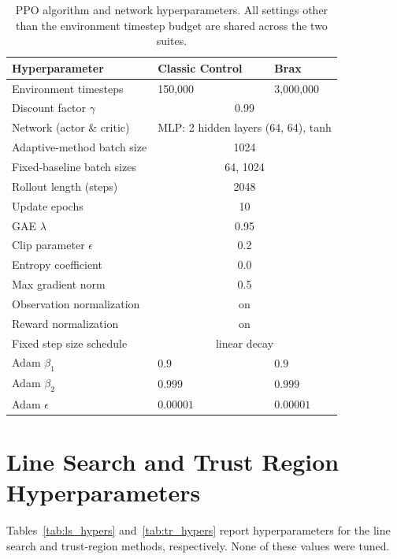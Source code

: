 \begin{table}[htbp]
\centering
\small
\setlength{\tabcolsep}{6pt}
\renewcommand{\arraystretch}{1.2}
\begin{tabular}{@{}l l l@{}}
\toprule
Hyperparameter & Classic Control & Brax \\
\midrule
Environment timesteps & 150{,}000 & 3{,}000{,}000 \\
Discount factor $\gamma$ & \multicolumn{2}{c}{0.99} \\
Network (actor \& critic) & \multicolumn{2}{c}{MLP: 2 hidden layers (64, 64), tanh} \\
Adaptive-method batch size & \multicolumn{2}{c}{1024} \\
Fixed-baseline batch sizes & \multicolumn{2}{c}{64, 1024} \\
Rollout length (steps) & \multicolumn{2}{c}{2048} \\
Update epochs & \multicolumn{2}{c}{10} \\
GAE $\lambda$ & \multicolumn{2}{c}{0.95} \\
Clip parameter $\epsilon$ & \multicolumn{2}{c}{0.2} \\
Entropy coefficient & \multicolumn{2}{c}{0.0} \\
Max gradient norm & \multicolumn{2}{c}{0.5} \\
Observation normalization & \multicolumn{2}{c}{on} \\
Reward normalization & \multicolumn{2}{c}{on} \\
Fixed step size schedule & \multicolumn{2}{c}{linear decay} \\
Adam $\beta_1$ & $0.9$ & $0.9$ \\
Adam $\beta_2$ & $0.999$ & $0.999$ \\
Adam $\epsilon$ & $0.00001$ & $0.00001$ \\
\bottomrule
\end{tabular}
\caption[PPO algorithm and network hyperparameters.]{PPO algorithm and network hyperparameters. All settings other than the environment timestep budget are shared across the two suites.}
\label{tab:ppo_hypers}
\end{table}

\FloatBarrier
\section{Line Search and Trust Region Hyperparameters} \label{app_globalization_hypers}
Tables~\ref{tab:ls_hypers} and~\ref{tab:tr_hypers} report hyperparameters for the line search and trust-region methods, respectively. None of these values were tuned.

